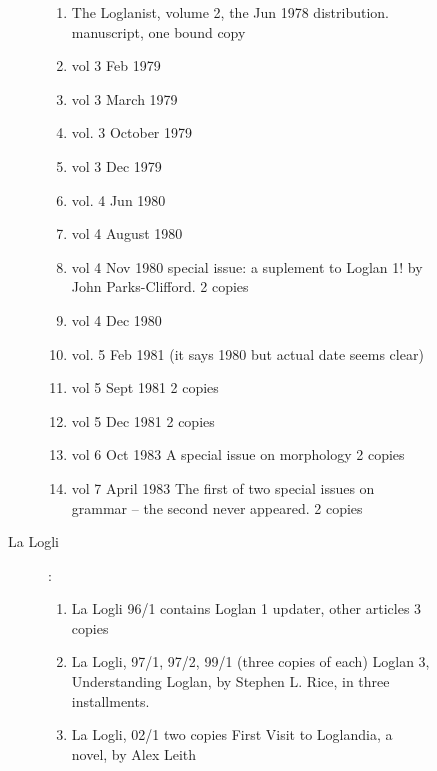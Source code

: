 \documentclass[12pt]{article}
\begin{document}
\begin{description}
\begin{description}
\begin{description}
\begin{enumerate}
\item The Loglanist, volume 2, the Jun 1978 distribution.  manuscript, one bound copy

\item vol 3 Feb 1979

\item vol 3 March 1979

\item vol. 3 October 1979

\item vol 3 Dec 1979

\item vol. 4 Jun 1980

\item  vol 4 August 1980

\item vol 4 Nov 1980 special issue:  a suplement to Loglan 1!  by John Parks-Clifford.  2 copies

 \item vol 4 Dec 1980

\item vol. 5 Feb 1981 (it says 1980 but actual date seems clear)

\item vol 5 Sept 1981  2 copies

\item vol 5 Dec 1981 2 copies

\item vol 6 Oct 1983  A special issue on morphology 2 copies

\item vol 7 April 1983  The first of two special issues on grammar -- the second never appeared.  2 copies

 \end{enumerate}

\item[La Logli]:  


\begin{enumerate}

\item  La Logli 96/1   contains Loglan 1 updater, other articles  3 copies

\item La Logli, 97/1, 97/2, 99/1 (three copies of each)  Loglan 3, Understanding Loglan, by Stephen L. Rice, in three installments.

\item La Logli, 02/1 two copies  First Visit to Loglandia, a novel, by Alex Leith


\end{enumerate}
\end{description}
\end{description}
\end{description}
\end{document}
